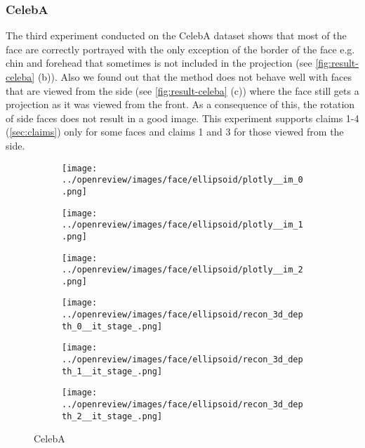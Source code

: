 \subsubsection{CelebA}
The third experiment conducted on the CelebA dataset shows that most of the face are correctly portrayed with the only exception of the border of the face e.g. chin and forehead that sometimes is not included in the projection (see \autoref{fig:result-celeba} (b)). Also we found out that the method does not behave well with faces that are viewed from the side (see \autoref{fig:result-celeba} (c)) where the face still gets a projection as it was viewed from the front. As a consequence of this, the rotation of side faces does not result in a good image. This experiment supports claims 1-4 (\autoref{sec:claims}) only for some faces and claims 1 and 3 for those viewed from the side.
\begin{figure}[h]
    \begin{subfigure}{0.33\textwidth}
        \centering
        \texttt{[image: ../openreview/images/face/ellipsoid/plotly\_\_im\_0.png]}
    \end{subfigure}
    \begin{subfigure}{0.33\textwidth}
        \centering
        \texttt{[image: ../openreview/images/face/ellipsoid/plotly\_\_im\_1.png]}
    \end{subfigure}
    \begin{subfigure}{0.33\textwidth}
        \centering
        \texttt{[image: ../openreview/images/face/ellipsoid/plotly\_\_im\_2.png]}
    \end{subfigure}
    \begin{subfigure}{0.33\textwidth}
        \centering
        \texttt{[image: ../openreview/images/face/ellipsoid/recon\_3d\_depth\_0\_\_it\_stage\_.png]}
        \caption{}
    \end{subfigure}
    \begin{subfigure}{0.33\textwidth}
        \centering
        \texttt{[image: ../openreview/images/face/ellipsoid/recon\_3d\_depth\_1\_\_it\_stage\_.png]}
        \caption{}
    \end{subfigure}
    \begin{subfigure}{0.33\textwidth}
        \centering
        \texttt{[image: ../openreview/images/face/ellipsoid/recon\_3d\_depth\_2\_\_it\_stage\_.png]}
        \caption{}
    \end{subfigure}
    \caption{CelebA}
    \label{fig:result-celeba}
\end{figure}
